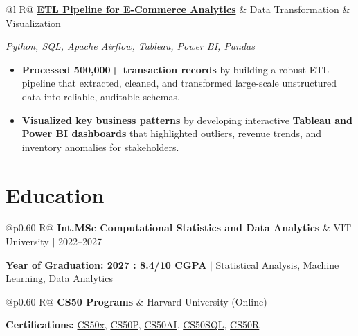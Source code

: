 \documentclass[a4paper,11pt]{article}
\newcommand{\subheading}[1]{\textbf{#1}}
\newcommand{\meta}[1]{{\fontsize{10}{12}\selectfont\textcolor[HTML]{3A3A3A}{#1}}}
\newcommand{\techstack}[1]{{\fontsize{10}{12}\selectfont\textcolor[HTML]{1A1A1A}{\textit{#1}}}}
\newcommand{\ulink}[2]{\href{#1}{#2}}
\begin{document}
\begin{tabularx}{\linewidth}{@{}l R@{}}
\subheading{\ulink{https://github.com/su-jin1425/ETL-Pipeline-for-E-Commerce-Analytics}{ETL Pipeline for E-Commerce Analytics}} & \meta{Data Transformation \& Visualization}
\end{tabularx}
\techstack{Python, SQL, Apache Airflow, Tableau, Power BI, Pandas}
\begin{itemize}[nosep, leftmargin=1.5em, itemsep=2pt, topsep=2pt]
  \item {\color[HTML]{0A0A0A}\fontsize{11}{14}\selectfont \textbf{Processed 500,000+ transaction records} by building a robust ETL pipeline that extracted, cleaned, and transformed large-scale unstructured data into reliable, auditable schemas.}
  \item {\color[HTML]{0A0A0A}\fontsize{11}{14}\selectfont \textbf{Visualized key business patterns} by developing interactive \textbf{Tableau and Power BI dashboards} that highlighted outliers, revenue trends, and inventory anomalies for stakeholders.}
\end{itemize}

\section{Education}
\vspace{2pt}

\begin{tabularx}{\linewidth}{@{}p{0.60\linewidth} R@{}}
\subheading{Int.MSc Computational Statistics and Data Analytics} & \meta{VIT University $|$ 2022--2027}
\end{tabularx}
{\color[HTML]{3A3A3A}\fontsize{11}{14}\selectfont \textbf{Year of Graduation: 2027 : 8.4/10 CGPA} $|$ Statistical Analysis, Machine Learning, Data Analytics}

\begin{tabularx}{\linewidth}{@{}p{0.60\linewidth} R@{}}
\subheading{CS50 Programs} & \meta{Harvard University (Online)}
\end{tabularx}
{\color[HTML]{3A3A3A}\fontsize{11}{14}\selectfont \textbf{Certifications:} \ulink{https://cs50.harvard.edu/certificates/b14b78df-e05c-413e-a607-1dd27303053a}{CS50x}, \ulink{https://cs50.harvard.edu/certificates/32477052-9db4-49c4-a5a4-d7e58429ca2c}{CS50P}, \ulink{https://cs50.harvard.edu/certificates/9cdb4d4a-1250-4f8e-9fd7-191864e0f919}{CS50AI}, \ulink{https://cs50.harvard.edu/certificates/bc486f24-f085-4e61-8536-80940b97a1b9}{CS50SQL}, \ulink{https://cs50.harvard.edu/certificates/666838e6-a053-4d82-b179-a60fe745fd84}{CS50R}}
\end{document}

